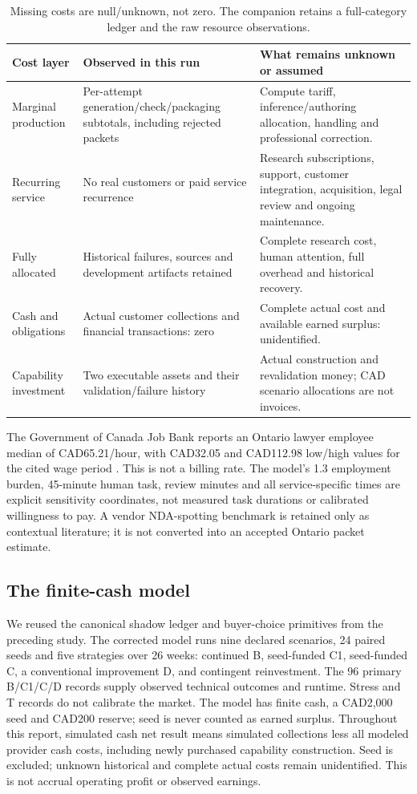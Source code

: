\documentclass[10pt,a4paper]{article}
\begin{document}
\begin{table}[H]\small
\begin{tabularx}{\textwidth}{@{}p{}YY@{}}\toprule
\textbf{Cost layer} & \textbf{Observed in this run} & \textbf{What remains unknown or assumed}\\\midrule
Marginal production & Per-attempt generation/check/packaging subtotals, including rejected packets & Compute tariff, inference/authoring allocation, handling and professional correction.\\
Recurring service & No real customers or paid service recurrence & Research subscriptions, support, customer integration, acquisition, legal review and ongoing maintenance.\\
Fully allocated & Historical failures, sources and development artifacts retained & Complete research cost, human attention, full overhead and historical recovery.\\
Cash and obligations & Actual customer collections and financial transactions: zero & Complete actual cost and available earned surplus: unidentified.\\
Capability investment & Two executable assets and their validation/failure history & Actual construction and revalidation money; CAD scenario allocations are not invoices.\\\bottomrule
\end{tabularx}
\caption{Missing costs are null/unknown, not zero. The companion retains a full-category ledger and the raw resource observations.}
\end{table}

The Government of Canada Job Bank reports an Ontario lawyer employee median of CAD65.21/hour, with CAD32.05 and CAD112.98 low/high values for the cited wage period \cite{jobbank}. This is not a billing rate. The model's 1.3 employment burden, 45-minute human task, review minutes and all service-specific times are explicit sensitivity coordinates, not measured task durations or calibrated willingness to pay. A vendor NDA-spotting benchmark is retained only as contextual literature; it is not converted into an accepted Ontario packet estimate.

\subsection{The finite-cash model}
We reused the canonical shadow ledger and buyer-choice primitives from the preceding study. The corrected model runs nine declared scenarios, 24 paired seeds and five strategies over 26 weeks: continued B, seed-funded C1, seed-funded C, a conventional improvement D, and contingent reinvestment. The 96 primary B/C1/C/D records supply observed technical outcomes and runtime. Stress and T records do not calibrate the market. The model has finite cash, a CAD2,000 seed and CAD200 reserve; seed is never counted as earned surplus. Throughout this report, simulated cash net result means simulated collections less all modeled provider cash costs, including newly purchased capability construction. Seed is excluded; unknown historical and complete actual costs remain unidentified. This is not accrual operating profit or observed earnings.
\end{document}
